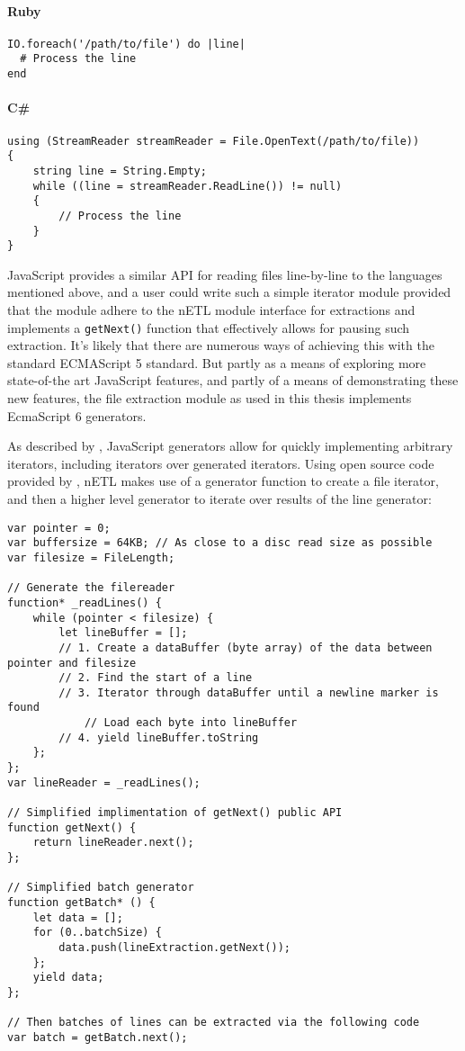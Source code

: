 \paragraph*{Ruby}
\begin{verbatim}
IO.foreach('/path/to/file') do |line|
  # Process the line
end
\end{verbatim}

\paragraph*{C\#}
\begin{verbatim}
using (StreamReader streamReader = File.OpenText(/path/to/file))
{
    string line = String.Empty;
    while ((line = streamReader.ReadLine()) != null)
    {
        // Process the line
    }
}
\end{verbatim}

JavaScript provides a similar API for reading files line-by-line to the languages mentioned above, and a user could write such a simple iterator module provided that the module adhere to the nETL module interface for extractions and implements a \texttt{getNext()} function that effectively allows for pausing such extraction. It's likely that there are numerous ways of achieving this with the standard ECMAScript 5 standard. But partly as a means of exploring more state-of-the art JavaScript features, and partly of a means of demonstrating these new features, the file extraction module as used in this thesis implements EcmaScript 6 generators.

As described by \cite{mozillaGenerators}, JavaScript generators allow for quickly implementing arbitrary iterators, including iterators over generated iterators. Using open source code provided by \cite{bower16}, nETL makes use of a generator function to create a file iterator, and then a higher level generator to iterate over results of the line generator:

\begin{verbatim}
var pointer = 0;
var buffersize = 64KB; // As close to a disc read size as possible
var filesize = FileLength;

// Generate the filereader
function* _readLines() {
    while (pointer < filesize) {
        let lineBuffer = [];
        // 1. Create a dataBuffer (byte array) of the data between pointer and filesize
        // 2. Find the start of a line
        // 3. Iterator through dataBuffer until a newline marker is found
            // Load each byte into lineBuffer
        // 4. yield lineBuffer.toString
    };
};
var lineReader = _readLines();

// Simplified implimentation of getNext() public API
function getNext() {
    return lineReader.next();
};

// Simplified batch generator
function getBatch* () {
    let data = [];
    for (0..batchSize) {
        data.push(lineExtraction.getNext());
    };
    yield data;
};

// Then batches of lines can be extracted via the following code
var batch = getBatch.next();
\end{verbatim}

